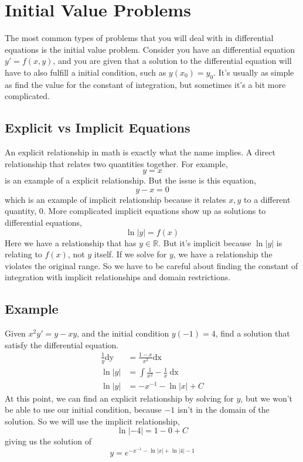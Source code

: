 \section{Initial Value Problems}
The most common types of problems that you will deal with in differential equations is the initial value problem. Consider you have an differential equation $y'=f(x,y)$, and you are given that a solution to the differential equation will have to also fulfill a initial condition, such as $y(x_0) = y_0$. It's usually as simple as find the value for the constant of integration, but sometimes it's a bit more complicated. 

\subsection{Explicit vs Implicit Equations}
An explicit relationship in math is exactly what the name implies. A direct relationship that relates two quantities together. For example, 
\begin{equation*}
	y = x 
\end{equation*}
is an example of a explicit relationship. But the issue is this equation, 
\begin{equation*}
	y - x = 0 
\end{equation*}
which is an example of implicit relationship because it relates $x,y$ to a different quantity, $0$.
More complicated implicit equations show up as solutions to differential equations, 
\begin{equation*}
\ln|y| = f(x)
\end{equation*} 
Here we have a relationship that has $y \in \mathbb{R}$. But it's implicit because $\ln|y|$ is relating to $f(x)$, not $y$ itself. If we solve for $y$, we have a relationship the violates the original range. So we have to be careful about finding the constant of integration with implicit relationships and domain restrictions.
\subsection{Example}
Given $x^2y'= y- xy$, and the initial condition $y(-1) = 4$, find a solution that satisfy the differential equation.
\begin{align*}
	\frac{1}{y} \mathrm{dy} &= \frac{1-x}{x^2} \mathrm{dx} \\ 
	\ln |y| &= \int \frac{1}{x^2} - \frac{1}{x} \: \mathrm{dx} \\ 
	\ln |y| &= -x^{-1} - \ln|x| + C  
\end{align*}
At this point, we can find an explicit relationship by solving for $y$, but we won't be able to use our initial condition, because $-1$ isn't in the domain of the solution. So we will use the implicit relationship, 
\begin{equation*}
	\ln|-4| = 1 - 0 + C 
\end{equation*}
giving us the solution of 
\begin{equation*}
	y = e^{-x^{-1} - \ln|x| + \ln|4| - 1}
\end{equation*}	